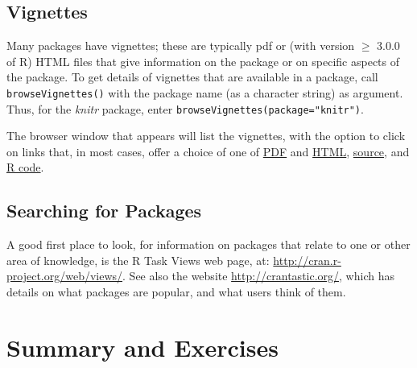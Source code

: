 \documentclass{tufte-book}\usepackage[]{graphicx}\usepackage[]{color}
\newcommand{\txtt}[1]{\texttt{#1}}
\begin{document}
\subsection*{Vignettes}

  Many packages
have vignettes; these are typically pdf or (with version $\ge$ 3.0.0
of R) HTML files that give information on the package or on specific
aspects of the package. To get details of vignettes that are available
in a package, call \txtt{browseVignettes()} with the package name (as
a character string) as argument.  Thus, for the \textit{knitr}
package, enter \txtt{browseVignettes(package="knitr")}.

The browser window that appears will list the vignettes, with the
option to click on links that, in most cases, offer a choice of
one of \underline{PDF} and \underline{HTML}, \underline{source},
and \underline{R code}.

\subsection*{Searching for Packages}

A good first place to look, for information on packages that relate to
one or other area of knowledge, is the R Task Views web page, at:
\url{http://cran.r-project.org/web/views/}. See also the website
\url{http://crantastic.org/}, which has details on what packages are
popular, and what users think of them.


\section{Summary and Exercises}
\end{document}
